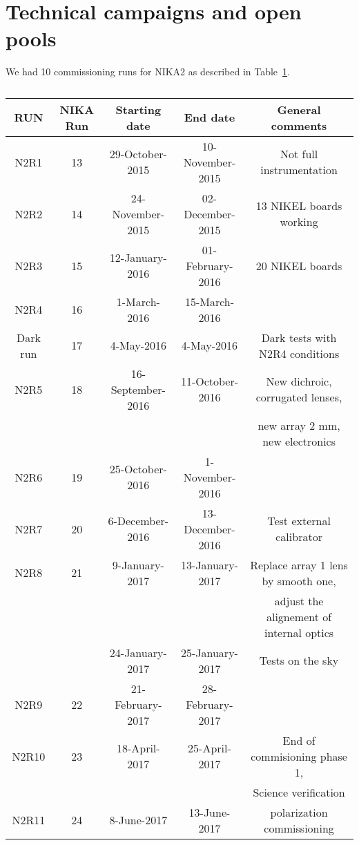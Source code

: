 \section{Technical campaigns and open pools}
We had 10 commissioning runs for NIKA2 as described in Table~\ref{nika2runs}.

\begin{table}[h]
\small
\begin{center} 
\begin{tabular}{|c|c|c|c|c|}
\hline 
RUN  & NIKA Run & Starting date    & End date         &  General comments \\
\hline
N2R1     & 13       & 29-October-2015   & 10-November-2015 & Not full instrumentation        \\
N2R2     & 14       & 24-November-2015  & 02-December-2015 & 13 NIKEL boards working         \\
N2R3     & 15       & 12-January-2016   & 01-February-2016 & 20 NIKEL boards                 \\
N2R4     & 16       & 1-March-2016      & 15-March-2016    & 	                               \\
Dark run & 17       & 4-May-2016        & 4-May-2016       & Dark tests with N2R4 conditions  \\
\hline
N2R5     & 18       & 16-September-2016 & 11-October-2016  & New dichroic, corrugated lenses, \\
         &          &                   &                  &  new array 2 mm, new electronics \\
N2R6     & 19       & 25-October-2016   & 1-November-2016  &                                  \\
N2R7     & 20       & 6-December-2016   & 13-December-2016 & Test external calibrator         \\
N2R8     & 21       & 9-January-2017    & 13-January-2017  & Replace array 1 lens by smooth one, \\
         &          &                   &                  &  adjust the alignement of internal optics \\ 
         &          & 24-January-2017   & 25-January-2017  & Tests on the sky   \\
N2R9     & 22       & 21-February-2017  & 28-February-2017 &                                   \\
N2R10    & 23       & 18-April-2017     & 25-April-2017    & End of commisioning phase 1,     \\
         &          &                   &                  & Science verification  \\  
N2R11  & 24       &  8-June-2017   & 13-June-2017  &  polarization commissioning  \\
\hline
\end{tabular}
\caption[Commissioning campaigns, dates and general comments.]{
\label{nika2runs}}
\end{center} 
\end{table} 



